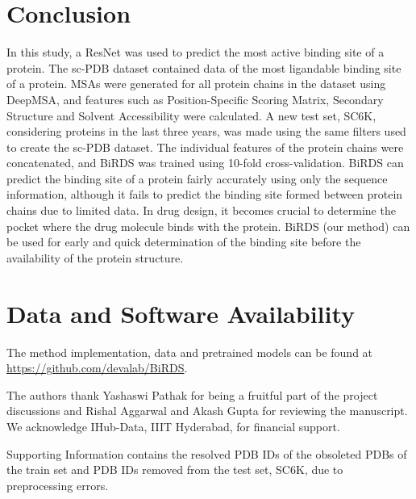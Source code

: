 \documentclass[journal=jcisd8,manuscript=article]{achemso}
\begin{document}
\section{Conclusion}
In this study, a ResNet was used to predict the most active binding site of a protein. The sc-PDB\cite{desaphy2015sc} dataset contained data of the most ligandable binding site of a protein. MSAs were generated for all protein chains in the dataset using DeepMSA, and features such as Position-Specific Scoring Matrix, Secondary Structure and Solvent Accessibility were calculated. A new test set, SC6K, considering proteins in the last three years, was made using the same filters used to create the sc-PDB dataset. The individual features of the protein chains were concatenated, and BiRDS was trained using 10-fold cross-validation. BiRDS can predict the binding site of a protein fairly accurately using only the sequence information, although it fails to predict the binding site formed between protein chains due to limited data. In drug design, it becomes crucial to determine the pocket where the drug molecule binds with the protein. BiRDS (our method) can be used for early and quick determination of the binding site before the availability of the protein structure.

\section{Data and Software Availability}
The method implementation, data and pretrained models can be found at \newline
\href{https://github.com/devalab/BiRDS}{https://github.com/devalab/BiRDS}.

\begin{acknowledgement}
    The authors thank Yashaswi Pathak for being a fruitful part of the project discussions and Rishal Aggarwal and Akash Gupta for reviewing the manuscript. We acknowledge IHub-Data, IIIT Hyderabad, for financial support.
\end{acknowledgement}

\begin{suppinfo}
    Supporting Information contains the resolved PDB IDs of the obsoleted PDBs of the train set and PDB IDs removed from the test set, SC6K, due to preprocessing errors.
\end{suppinfo}


\end{document}
